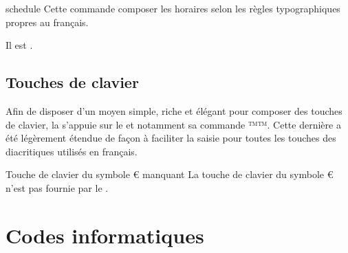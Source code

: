 \documentclass{letgut}
\begin{document}
\begin{docCommand}{schedule}{}
  Cette commande composer les horaires selon les règles typographiques propres
  au français.
\end{docCommand}

\begin{ltx-code-result}[title addon=composition d'horaire]
Il est .
\end{ltx-code-result}

\subsection{Touches de clavier}
\label{sec:touches-de-clavier}

Afin de disposer d'un moyen simple, riche et élégant pour composer des touches
de clavier, la  s'appuie sur le  et notamment sa
commande ™\LKey™. Cette dernière a été légèrement étendue de façon à faciliter
la saisie pour toutes les touches des diacritiques utilisés en français.

\begin{ltx-code-result}[title addon=touches de clavier]
   

 

\LKeyCtrl \LKeyAlt \LKeyAltGr \LKeyShift \LKeyEnter \LKeyTab

   

\LKeyAt \LKeyScreenUp \LKeyScreenDown \LKeyCommand \LKeyOptionKey

\LMouseN \LMouseL \LMouseM \LMouseR

   

     
     
   
 
     
   
\end{ltx-code-result}

\begin{dbwarning}{Touche de clavier du symbole € manquant}{}
  La touche de clavier du symbole € n'est pas fournie par le
  .
\end{dbwarning}

\section{Codes informatiques}
\label{sec:code-informatique}
\end{document}

